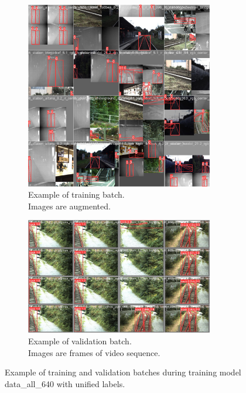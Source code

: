 \documentclass[Master,MDS,english]{BASE/twbook} %
\begin{document}
\begin{figure}[H]
\centering
\begin{subfigure}[t]{.5\textwidth}
  \centering
  \includegraphics[width=0.9\textwidth]{images/yolo/all/train_batch0}
  \caption{Example of training batch.\\ Images are augmented.}
    \label{fig:mosaic_augmentation_all}
\end{subfigure}%
\begin{subfigure}[t]{.5\textwidth}
  \centering
  \includegraphics[width=0.9\textwidth]{images/yolo/all/val_batch2_pred}
  \caption{Example of validation batch.\\ Images are frames of video sequence.}
  \label{fig:validation_batch_1}
\end{subfigure}
\caption{Example of training and validation batches during training model data\_all\_640 with unified labels.}
\label{fig:yolo_all_example}
\end{figure}
\end{document}
